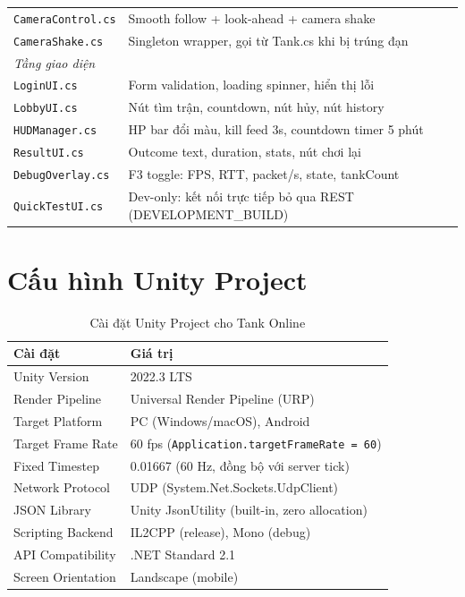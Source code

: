 \documentclass[12pt,a4paper]{report}
\begin{document}
\begin{table}[H]
\begin{tabularx}{\textwidth}{lX}
\texttt{CameraControl.cs}  & Smooth follow + look-ahead + camera shake \\
\texttt{CameraShake.cs}    & Singleton wrapper, gọi từ Tank.cs khi bị trúng đạn \\
\midrule
\multicolumn{2}{l}{\textit{Tầng giao diện}} \\
\texttt{LoginUI.cs}        & Form validation, loading spinner, hiển thị lỗi \\
\texttt{LobbyUI.cs}        & Nút tìm trận, countdown, nút hủy, nút history \\
\texttt{HUDManager.cs}     & HP bar đổi màu, kill feed 3s, countdown timer 5 phút \\
\texttt{ResultUI.cs}       & Outcome text, duration, stats, nút chơi lại \\
\texttt{DebugOverlay.cs}   & F3 toggle: FPS, RTT, packet/s, state, tankCount \\
\texttt{QuickTestUI.cs}    & Dev-only: kết nối trực tiếp bỏ qua REST (DEVELOPMENT\_BUILD) \\
\bottomrule
\end{tabularx}
\end{table}

\section{Cấu hình Unity Project}

\begin{table}[H]
\centering
\caption{Cài đặt Unity Project cho Tank Online}
\label{tab:unityconfig}
\begin{tabularx}{\textwidth}{lX}
\toprule
\textbf{Cài đặt} & \textbf{Giá trị} \\
\midrule
Unity Version        & 2022.3 LTS \\
Render Pipeline      & Universal Render Pipeline (URP) \\
Target Platform      & PC (Windows/macOS), Android \\
Target Frame Rate    & 60 fps (\texttt{Application.targetFrameRate = 60}) \\
Fixed Timestep       & 0.01667 (60 Hz, đồng bộ với server tick) \\
Network Protocol     & UDP (System.Net.Sockets.UdpClient) \\
JSON Library         & Unity JsonUtility (built-in, zero allocation) \\
Scripting Backend    & IL2CPP (release), Mono (debug) \\
API Compatibility    & .NET Standard 2.1 \\
Screen Orientation   & Landscape (mobile) \\
\bottomrule
\end{tabularx}
\end{table}
\end{document}
